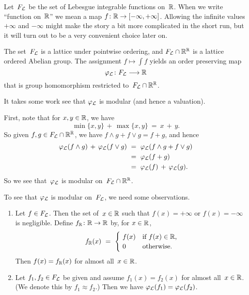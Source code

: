 \documentclass[main.tex]{subfiles}
\begin{document}
%
%
\begin{ex}
\label{E:int-val}
Let~$F_{\mathcal{L}}$ be the set of
Lebesgue integrable functions on~$\mathbb{R}$.
When we write ``function on~$\mathbb{R}$''
we mean a map $f\colon \mathbb{R} \rightarrow {[-\infty,+\infty]}$.
Allowing the infinite values $+\infty$
and $-\infty$
might make the story a bit more complicated
in the short run,
but it will turn out to be a very convenient choice later on.


The set~$F_{\mathcal{L}}$ is a lattice
under pointwise ordering,
and  $F_{\mathcal{L}}\cap \mathbb{R}^{\mathbb{R}}$
is a lattice ordered Abelian group.
The assignment $f\mapsto \int f$ 
yields an order preserving map
\begin{equation*}
\varphi_{\mathcal{L}}\colon F_{\mathcal{L}}\longrightarrow \mathbb{R}
\end{equation*}
that is group homomorphism
restricted to~$F_{\mathcal{L}}\cap \mathbb{R}^{\mathbb{R}}$.

It takes some work see that $\varphi_{\mathcal{L}}$ is modular (and hence a valuation).

First,
note that for $x,y\in \mathbb{R}$, we have
\begin{equation*}
\min\{x,y\}\,+\,\max\{x,y\} \ =\ x\,+\,y.
\end{equation*}
So given $f,g\in F_{\mathcal{L}}\cap \mathbb{R}^{\mathbb{R}}$,
we have $f\wedge g + f \vee g = f+ g$,
and hence
\begin{equation}
\label{eq:lint-fin-mod}
\begin{alignedat}{3}
\varphi_{\mathcal{L}}(f\wedge g) \,+\, \varphi_{\mathcal{L}}(f\vee g) 
\ &=\ \varphi_{\mathcal{L}}(f\wedge g + f\vee g)\\
\ &=\  \varphi_{\mathcal{L}}(f+g)\\
\ &=\  \varphi_{\mathcal{L}} (f)\,+\,\varphi_{\mathcal{L}}(g).
\end{alignedat}
\end{equation}
So we see that~$\varphi_{\mathcal{L}}$ is modular on~$F_{\mathcal{L}}\cap \mathbb{R}^{\mathbb{R}}$.

To see that $\varphi_{\mathcal{L}}$ is modular on~$F_{\mathcal{L}}$, we need some observations.
\begin{enumerate}
\item
\label{negl:1}
Let $f\in F_{\mathcal{L}}$.
Then the set of~$x\in \mathbb{R}$ such that $f(x) = +\infty$ 
or $f(x)=-\infty$
is negligible.
Define $f_{\mathbb{R}}\colon \mathbb{R} \rightarrow \mathbb{R}$ by,
for $x\in \mathbb{R}$,
\begin{equation*}
f_{\mathbb{R}}(x) \ =\
\begin{cases}
\ f(x) &\text{if $f(x)\in\mathbb{R}$,}\\
\ 0 &\text{otherwise.}
\end{cases}
\end{equation*}
Then $f(x)=f_{\mathbb{R}}(x)$
for almost all~$x\in \mathbb{R}$.

\item
\label{negl:2}
Let $f_1,f_2 \in F_{\mathcal{L}}$
be given and assume $f_1(x) = f_2(x)$
for almost all~$x\in \mathbb{R}$.
(We denote this by $f_1 \approx f_2$.)
Then we have  $\varphi_{\mathcal{L}}(f_1) = \varphi_{\mathcal{L}}(f_2)$.


\end{enumerate}
\end{ex}
\end{document}
